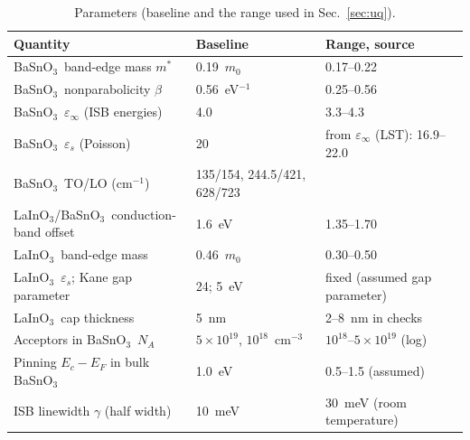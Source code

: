 \documentclass[11pt]{article}
\newcommand{\LIO}{\texorpdfstring{LaInO$_3$}{LaInO3}}
\newcommand{\BSO}{\texorpdfstring{BaSnO$_3$}{BaSnO3}}
\begin{document}
\begin{table}[t]
\centering\small
\caption{Parameters (baseline and the range used in Sec.~\ref{sec:uq}).}\label{tab:par}
\begin{tabular}{lll}
\toprule
Quantity & Baseline & Range, source \\
\midrule
\BSO\ band-edge mass $m^*$ & 0.19~$m_0$ & 0.17--0.22 \cite{Niedermeier2017,Krishnaswamy2017,Aggoune2022} \\
\BSO\ nonparabolicity $\beta$ & 0.56~eV$^{-1}$ & 0.25--0.56 \cite{Niedermeier2017,Krishnaswamy2017} \\
\BSO\ $\varepsilon_\infty$ (ISB energies) & 4.0 & 3.3--4.3 \cite{Stanislavchuk2012,Krishnaswamy2017,Aggoune2022} \\
\BSO\ $\varepsilon_s$ (Poisson) & 20 & from $\varepsilon_\infty$ (LST): 16.9--22.0 \cite{Stanislavchuk2012} \\
\BSO\ TO/LO (cm$^{-1}$) & 135/154, 244.5/421, 628/723 & \cite{Stanislavchuk2012} \\
\LIO/\BSO\ conduction-band offset & 1.6~eV & 1.35--1.70 \cite{Kim2019LIO,Lee2024LIO,Aggoune2021} \\
\LIO\ band-edge mass & 0.46~$m_0$ & 0.30--0.50 \cite{Kim2019LIO,Aggoune2021,Jang2017LIO} \\
\LIO\ $\varepsilon_s$; Kane gap parameter & 24; 5~eV & fixed (assumed gap parameter) \\
\LIO\ cap thickness & 5~nm & 2--8~nm in checks \cite{Lee2024LIO} \\
Acceptors in \BSO\ $N_A$ & $5\times10^{19}$, $10^{18}$~cm$^{-3}$ & $10^{18}$--$5\times10^{19}$ (log) \cite{Kim2019LIO} \\
Pinning $E_c-E_F$ in bulk \BSO & 1.0~eV & 0.5--1.5 (assumed) \\
ISB linewidth $\gamma$ (half width) & 10~meV & 30~meV (room temperature) \\
\bottomrule
\end{tabular}
\end{table}
\end{document}
